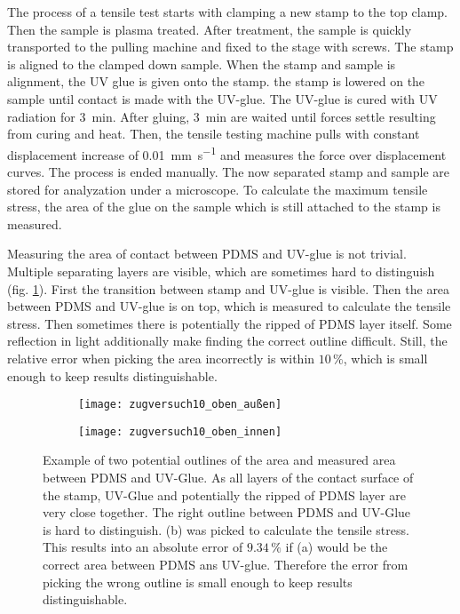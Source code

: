 The process of a tensile test starts with clamping a new stamp to the top clamp. Then the sample is plasma treated. After treatment, the sample is quickly transported to the pulling machine and fixed to the stage with screws. The stamp is aligned to the clamped down sample. When the stamp and sample is alignment, the UV glue is given onto the stamp. the stamp is lowered on the sample until contact is made with the UV-glue. The UV-glue is cured with UV radiation for \SI{3}{\minute}. After gluing, \SI{3}{\minute} are waited until forces settle resulting from curing and heat. Then, the tensile testing machine pulls with constant displacement increase of \SI{0,01}{\milli\meter\per\second} and measures the force over displacement curves. The process is ended manually. The now separated stamp and sample are stored for analyzation under a microscope. To calculate the maximum tensile stress, the area of the glue on the sample which is still attached to the stamp is measured.

Measuring the area of contact between PDMS and UV-glue is not trivial. Multiple separating layers are visible, which are sometimes hard to distinguish (fig. \ref{fig:AreaStamp}). First the transition between stamp and UV-glue is visible. Then the area between PDMS and UV-glue is on top, which is measured to calculate the tensile stress. Then sometimes there is potentially the ripped of PDMS layer itself. Some reflection in light additionally make finding the correct outline difficult. Still, the relative error when picking the area incorrectly is within $10\,\%$, which is small enough to keep results distinguishable.

\begin{figure}[hbt!]
	\centering
	\begin{subfigure}[]{0.45\textwidth}
		\centering
		\texttt{[image: zugversuch10\_oben\_außen]}
		\caption{}
	\end{subfigure}
	\begin{subfigure}[]{0.45\textwidth}
		\centering
		\texttt{[image: zugversuch10\_oben\_innen]}
		\caption{}
	\end{subfigure}
	\caption{Example of two potential outlines of the area and measured area between PDMS and UV-Glue. As all layers of the contact surface of the stamp, UV-Glue and potentially the ripped of PDMS layer are very close together. The right outline between PDMS and UV-Glue is hard to distinguish. (b) was picked to calculate the tensile stress. This results into an absolute error of $9.34\,\%$ if (a) would be the correct area between PDMS ans UV-glue. Therefore the error from picking the wrong outline is small enough to keep results distinguishable.}
	\label{fig:AreaStamp}
\end{figure}

